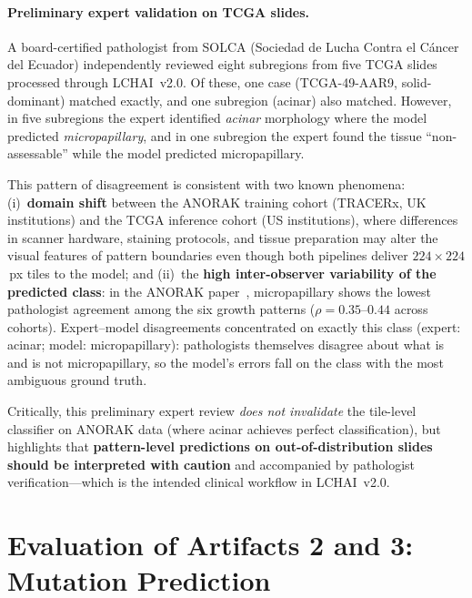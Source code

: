 \paragraph{Preliminary expert validation on TCGA slides.}
A board-certified pathologist from SOLCA (Sociedad de Lucha Contra el
C\'{a}ncer del Ecuador) independently reviewed eight subregions from
five TCGA slides processed through LCHAI~v2.0.
Of these, one case (TCGA-49-AAR9, solid-dominant) matched exactly,
and one subregion (acinar) also matched.
However, in five subregions the expert identified \emph{acinar} morphology
where the model predicted \emph{micropapillary}, and in one subregion
the expert found the tissue ``non-assessable'' while the model
predicted micropapillary.

This pattern of disagreement is consistent with two known phenomena:
(i)~\textbf{domain shift} between the ANORAK training cohort
(TRACERx, UK institutions) and the TCGA inference cohort (US
institutions), where differences in scanner hardware, staining
protocols, and tissue preparation may alter the visual features of
pattern boundaries even though both pipelines deliver
$224 \times 224$\,px tiles to the model; and
(ii)~the \textbf{high inter-observer variability of the predicted
class}: in the ANORAK paper~\cite{anorak2024}, micropapillary
shows the lowest pathologist agreement among the six growth patterns
($\rho = 0.35$--$0.44$ across cohorts).
Expert--model disagreements concentrated on exactly this class
(expert: acinar; model: micropapillary): pathologists themselves
disagree about what is and is not micropapillary, so the model's
errors fall on the class with the most ambiguous ground truth.

Critically, this preliminary expert review \emph{does not invalidate}
the tile-level classifier on ANORAK data (where acinar achieves
perfect classification), but highlights that
\textbf{pattern-level predictions on out-of-distribution slides
should be interpreted with caution} and accompanied by pathologist
verification---which is the intended clinical workflow in LCHAI~v2.0.


\section{Evaluation of Artifacts 2 and 3: Mutation Prediction}
\label{sec:eval:mutation}

